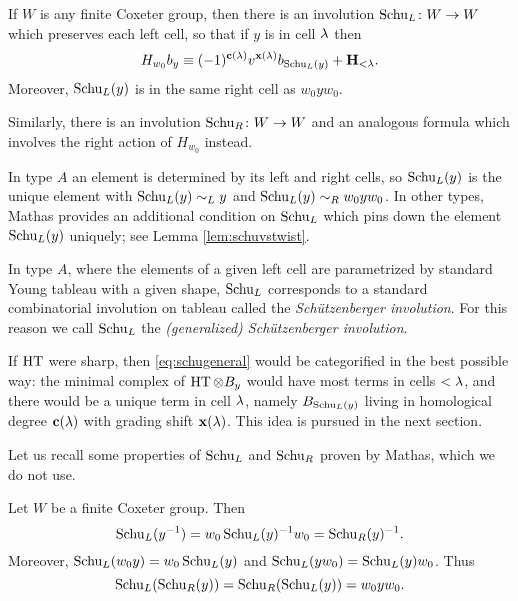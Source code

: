 \begin{thm} \label{thm:schugeneral} If $W$ is any finite Coxeter group, then there is an involution $\operatorname{Schu}_L \colon W \rightarrow W$ which preserves each left cell, so that if $y$ is in cell $\lambda$
then \begin{equation} \label{eq:schugeneral} H_{w_0} b_y \equiv (-1)^{\mathbf{c}(\lambda)} v^{\mathbf{x}(\lambda)} b_{\operatorname{Schu}_L(y)} + {\mathbf H}_{<\lambda}. \end{equation} Moreover, $\operatorname{Schu}_L(y)$ is in the same right cell
as $w_0 y w_0$.

Similarly, there is an involution $\operatorname{Schu}_R \colon W \rightarrow W$ and an analogous formula which involves the right action of $H_{w_0}$ instead.
\end{thm}

In type $A$ an element is determined by its left and right cells, so $\operatorname{Schu}_L(y)$ is the unique element with $\operatorname{Schu}_L(y) \sim_L y$ and $\operatorname{Schu}_L(y) \sim_R w_0 y w_0$. In
other types, Mathas provides an additional condition on $\operatorname{Schu}_L$ which pins down the element $\operatorname{Schu}_L(y)$ uniquely; see Lemma \ref{lem:schuvstwist}. 
	
In type $A$, where the elements of a given left cell are parametrized by standard Young tableau with a given shape, $\operatorname{Schu}_L$ corresponds to a standard combinatorial involution on tableau called the \emph{Sch\"utzenberger involution}.  For this reason we call $\operatorname{Schu}_L$ the \emph{(generalized) Sch\"utzenberger involution}.

\begin{remark} If $\operatorname{HT}$ were sharp, then \eqref{eq:schugeneral} would be categorified in the best possible way: the minimal complex of $\operatorname{HT} \otimes B_y$ would have most terms in cells $<
\lambda$, and there would be a unique term in cell $\lambda$, namely $B_{\operatorname{Schu}_L(y)}$ living in homological degree $\mathbf{c}(\lambda)$ with grading shift $\mathbf{x}(\lambda)$. This idea is pursued in the next
section. \end{remark}

Let us recall some properties of $\operatorname{Schu}_L$ and $\operatorname{Schu}_R$ proven by Mathas, which we do not use.

\begin{prop} Let $W$ be a finite Coxeter group. Then \begin{equation} \operatorname{Schu}_L(y^{-1}) = w_0 \operatorname{Schu}_L(y)^{-1} w_0 = \operatorname{Schu}_R(y)^{-1}. \end{equation} Moreover, $\operatorname{Schu}_L(w_0 y) = w_0 \operatorname{Schu}_L(y)$ and $\operatorname{Schu}_L(y w_0) = \operatorname{Schu}_L(y) w_0$. Thus \begin{equation} \operatorname{Schu}_L(\operatorname{Schu}_R(y)) = \operatorname{Schu}_R(\operatorname{Schu}_L(y)) = w_0 y w_0. \end{equation} \end{prop}

